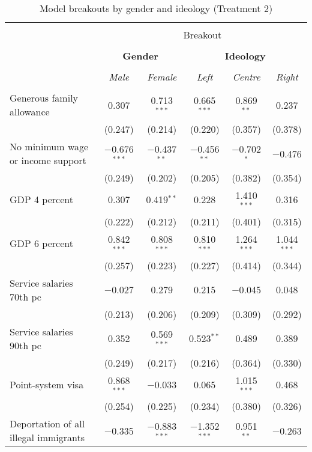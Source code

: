 \documentclass[12pt]{article}
\begin{document}
\begin{appendices}
\begin{landscape}
\begin{table}[!htbp] \centering \footnotesize
  \caption{Model breakouts by gender and ideology (Treatment 2)} 
  \label{tab:results_breakout2} 
\begin{tabular}{@{\extracolsep{5pt}}lccccc} 
\\[-1.8ex]\hline 
\hline \\[-1.8ex] 
 & \multicolumn{5}{c}{Breakout} \\
 \cline{2-6} \\
 & \multicolumn{2}{c}{\textbf{Gender}} & \multicolumn{3}{c}{\textbf{Ideology}} \\  
\cline{2-6} 
\\[-1.8ex] & \textit{Male} & \textit{Female} & \textit{Left} & \textit{Centre} & \textit{Right}\\ 
\hline \\[-1.8ex] 
  Generous family allowance & 0.307 & 0.713$^{***}$ & 0.665$^{***}$ & 0.869$^{**}$ & 0.237 \\ 
  & (0.247) & (0.214) & (0.220) & (0.357) & (0.378) \\ 
  No minimum wage or income support & $-$0.676$^{***}$ & $-$0.437$^{**}$ & $-$0.456$^{**}$ & $-$0.702$^{*}$ & $-$0.476 \\ 
  & (0.249) & (0.202) & (0.205) & (0.382) & (0.354) \\ 
  GDP 4 percent & 0.307 & 0.419$^{**}$ & 0.228 & 1.410$^{***}$ & 0.316 \\ 
  & (0.222) & (0.212) & (0.211) & (0.401) & (0.315) \\ 
  GDP 6 percent & 0.842$^{***}$ & 0.808$^{***}$ & 0.810$^{***}$ & 1.264$^{***}$ & 1.044$^{***}$ \\ 
  & (0.257) & (0.223) & (0.227) & (0.414) & (0.344) \\ 
  Service salaries 70th pc & $-$0.027 & 0.279 & 0.215 & $-$0.045 & 0.048 \\ 
  & (0.213) & (0.206) & (0.209) & (0.309) & (0.292) \\ 
  Service salaries 90th pc & 0.352 & 0.569$^{***}$ & 0.523$^{**}$ & 0.489 & 0.389 \\ 
  & (0.249) & (0.217) & (0.216) & (0.364) & (0.330) \\ 
  Point-system visa & 0.868$^{***}$ & $-$0.033 & 0.065 & 1.015$^{***}$ & 0.468 \\ 
  & (0.254) & (0.225) & (0.234) & (0.380) & (0.326) \\
  Deportation of all illegal immigrants & $-$0.335 & $-$0.883$^{***}$ & $-$1.352$^{***}$ & 0.951$^{**}$ & $-$0.263 \\ 

\end{tabular}
\end{table}
\end{landscape}
\end{appendices}
\end{document}
